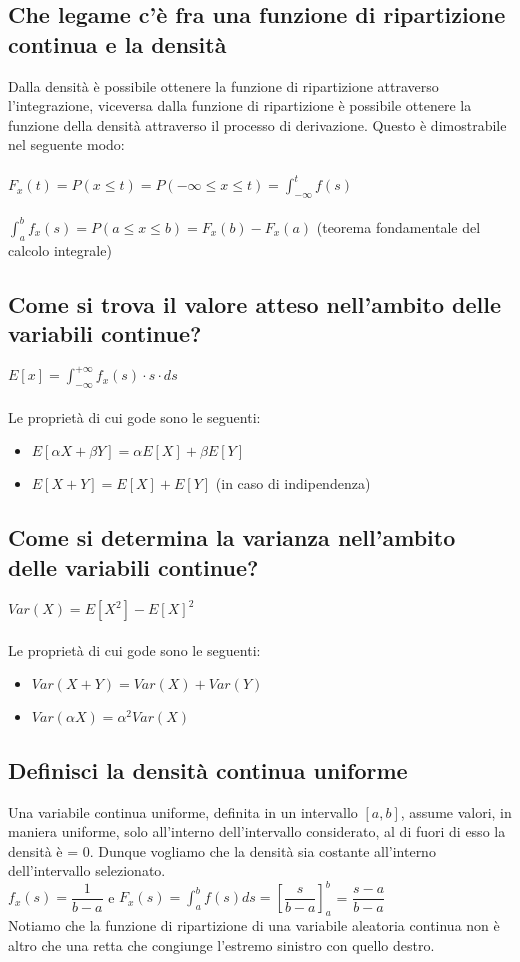 \documentclass[a4paper,12pt]{report}
\begin{document}
	\subsection{Che legame c'è fra una funzione di ripartizione continua e la densità}
	Dalla densità è possibile ottenere la funzione di ripartizione attraverso l'integrazione, viceversa dalla funzione di ripartizione è possibile ottenere la funzione della densità attraverso il processo di derivazione. Questo è dimostrabile nel seguente modo: \\\\
	$F_x(t) = P(x \leq t) = P(-\infty \leq x \leq t) = \int_{-\infty}^{t}f(s)$ \\\\
	$\int_{a}^{b}f_x(s) = P(a \leq x \leq b) = F_x(b) - F_x(a)$ (teorema fondamentale del calcolo integrale)
	\subsection{Come si trova il valore atteso nell'ambito delle variabili continue?}
	$E[x] = \int_{-\infty}^{+\infty} f_x(s) \cdot s \cdot ds$ \\\\
	Le proprietà di cui gode sono le seguenti: 
	\begin{itemize}
		\item $E[\alpha X + \beta Y] = \alpha E[X] + \beta E[Y]$
		\item $E[X + Y] = E[X] + E[Y]$ (in caso di indipendenza)
	\end{itemize}
	\subsection{Come si determina la varianza nell'ambito delle variabili continue?}
	$Var(X) = E[X^2] - E[X]^2$ \\\\
	Le proprietà di cui gode sono le seguenti: 
	\begin{itemize}
		\item $Var(X + Y) = Var(X) + Var(Y)$
		\item $Var(\alpha X) = \alpha^2 Var(X)$
	\end{itemize}
	\subsection{Definisci la densità continua uniforme}
	Una variabile continua uniforme, definita in un intervallo $[a, b]$, assume valori, in maniera uniforme, solo all'interno dell'intervallo considerato, al di fuori di esso la densità è = 0. Dunque vogliamo che la densità sia costante all'interno dell'intervallo selezionato.\\
	$f_x(s) = \dfrac{1}{b - a}$ e $F_x(s) = \int_{a}^{b}f(s)ds = [\dfrac{s}{b - a}]_{a}^{b}$ = $\dfrac{s - a}{b - a}$ \\
	Notiamo che la funzione di ripartizione di una variabile aleatoria continua non è altro che una retta che congiunge l'estremo sinistro con quello destro.
\end{document}
